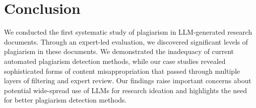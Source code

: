 \section{Conclusion}

We conducted the first systematic study of plagiarism in LLM-generated research documents. Through an expert-led evaluation, we discovered significant levels of plagiarism in these documents. We demonstrated the inadequacy of current automated plagiarism detection methods, 
while our case studies revealed sophisticated forms of content misappropriation that passed through multiple layers of filtering and expert review. 
Our findings raise important concerns about potential wide-spread use of LLMs for research ideation and highlights the need for better plagiarism detection methods.
